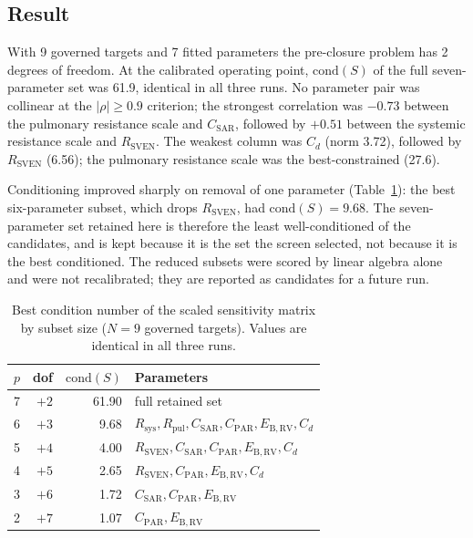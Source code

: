 \documentclass{article}
\begin{document}
\subsection{Result}
With 9 governed targets and 7 fitted parameters the pre-closure problem has 2 degrees of freedom. At the calibrated operating point, $\mathrm{cond}(S)$ of the full seven-parameter set was 61.9, identical in all three runs. No parameter pair was collinear at the $|\rho| \ge 0.9$ criterion; the strongest correlation was $-0.73$ between the pulmonary resistance scale and $C_{\mathrm{SAR}}$, followed by $+0.51$ between the systemic resistance scale and $R_{\mathrm{SVEN}}$. The weakest column was $C_d$ (norm 3.72), followed by $R_{\mathrm{SVEN}}$ (6.56); the pulmonary resistance scale was the best-constrained (27.6).

Conditioning improved sharply on removal of one parameter (Table~\ref{tab:S-cond}): the best six-parameter subset, which drops $R_{\mathrm{SVEN}}$, had $\mathrm{cond}(S) = 9.68$. The seven-parameter set retained here is therefore the least well-conditioned of the candidates, and is kept because it is the set the screen selected, not because it is the best conditioned. The reduced subsets were scored by linear algebra alone and were not recalibrated; they are reported as candidates for a future run.

\begin{table}[H]
\centering\small
\caption{Best condition number of the scaled sensitivity matrix by subset size ($N = 9$ governed targets). Values are identical in all three runs.}
\label{tab:S-cond}
\begin{tabular}{rrrl}
\toprule
$p$ & dof & $\mathrm{cond}(S)$ & \textbf{Parameters} \\
\midrule
7 & $+2$ & 61.90 & full retained set \\
6 & $+3$ & 9.68 & $R_{\mathrm{sys}}, R_{\mathrm{pul}}, C_{\mathrm{SAR}}, C_{\mathrm{PAR}}, E_{\mathrm{B,RV}}, C_d$ \\
5 & $+4$ & 4.00 & $R_{\mathrm{SVEN}}, C_{\mathrm{SAR}}, C_{\mathrm{PAR}}, E_{\mathrm{B,RV}}, C_d$ \\
4 & $+5$ & 2.65 & $R_{\mathrm{SVEN}}, C_{\mathrm{PAR}}, E_{\mathrm{B,RV}}, C_d$ \\
3 & $+6$ & 1.72 & $C_{\mathrm{SAR}}, C_{\mathrm{PAR}}, E_{\mathrm{B,RV}}$ \\
2 & $+7$ & 1.07 & $C_{\mathrm{PAR}}, E_{\mathrm{B,RV}}$ \\
\bottomrule
\end{tabular}
\end{table}
\end{document}
